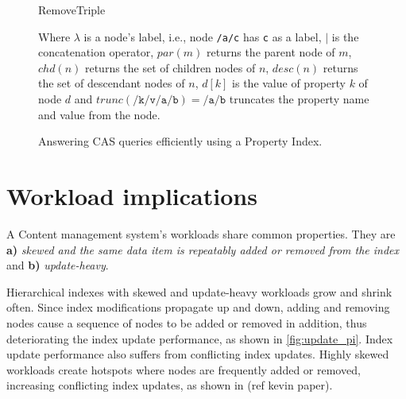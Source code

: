 \documentclass[abstracton,12pt]{scrreprt}
\begin{document}
\begin{figure}
\begin{multicols}{2}
        \begin{algorithm}[H]
            \DontPrintSemicolon
            \begin{scriptsize}
                \label{algo:remove_triple_pi}
                \caption{RemoveTriple}
            \end{scriptsize}
        \end{algorithm}
    \end{multicols}
    \begin{footnotesize}
        Where $\lambda$ is a node's label, i.e., node \texttt{/a/c} has \texttt{c} as a label,
        $|$ is the concatenation operator,
        $par(m)$ returns the parent node of $m$,
        $chd(n)$ returns the set of children nodes of $n$,
        $desc(n)$ returns the set of descendant nodes of $n$,
        $d[k]$ is the value of property $k$ of node $d$
        and $trunc(\texttt{/k/v/a/b}) = \texttt{/a/b}$ truncates the property name and value from the node.
    \end{footnotesize}
    \caption{Answering CAS queries efficiently using a Property Index.}
    \label{fig:property_index}
\end{figure}

\section{Workload implications}

A Content management system's workloads share common properties.
They are \textbf{a)} \textit{skewed and the same data item is repeatably added or removed from the index} and
\textbf{b)} \textit{update-heavy}.

Hierarchical indexes with skewed and update-heavy workloads grow and shrink often.
Since index modifications propagate up and down, adding and removing nodes cause a sequence of nodes to be added or removed in addition, thus deteriorating the index update performance, as shown in \cref{fig:update_pi}.
Index update performance also suffers from conflicting index updates.
Highly skewed workloads create hotspots where nodes are frequently added or removed, increasing conflicting index updates, as shown in (ref kevin paper).
\end{document}
